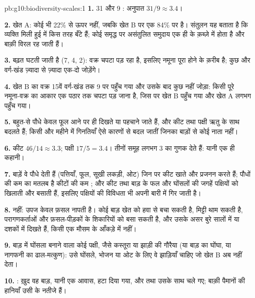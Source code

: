 \begin{solution}{pb:g10:biodiversity-scales:1}
\textbf{1.} 31 और 9 : अनुपात $31/9 \approx 3.4$।

\textbf{2.} खेत A: कोई भी  22\% से ऊपर नहीं, जबकि खेत B पर एक
84\% पर है। संतुलन यह बताता है कि व्यक्ति मिली हुई  में किस
तरह बँटे हैं; कोई समृद्ध पर असंतुलित समुदाय एक ही  के क़ब्ज़े में
होता है और बाक़ी विरल रह जाती हैं।

\textbf{3.} बढ़त घटती जाती है (7, 4, 2): वक्र चपटा पड़ रहा है, इसलिए
नमूना पूरा होने के क़रीब है; कुछ और वर्ग-खंड ज़्यादा से ज़्यादा एक-दो
 जोड़ेंगे।

\textbf{4.} खेत B का वक्र 15वें वर्ग-खंड तक 9 पर पहुँच गया और उसके बाद
कुछ नहीं जोड़ा: किसी पूरे नमूना-वक्र का आकार एक पठार तक चपटा पड़ जाना है,
जिस पर खेत B पहुँच गया और खेत A लगभग पहुँच गया।

\textbf{5.} बहुत-से पौधे केवल फूल आने पर ही दिखते या पहचाने जाते हैं, और
कीट तथा पक्षी ऋतु के साथ बदलते हैं; किसी और महीने में गिनतियाँ ऐसे
कारणों से बदल जातीं जिनका बाड़ों से कोई नाता नहीं।

\textbf{6.} कीट $46/14 \approx 3.3$; पक्षी $17/5 = 3.4$। तीनों समूह
लगभग 3 का गुणक देते हैं: यानी एक ही कहानी।

\textbf{7.} बाड़ें वे पौधे देती हैं (पत्तियाँ, फूल, सूखी लकड़ी, ओट)
जिन पर कीट खाते और प्रजनन करते हैं; पौधों की कम  का मतलब है
कीटों की कम ; और कीट तथा बाड़ के फल और घोंसलों की जगहें
पक्षियों को खिलाती और बसाती हैं, इसलिए पक्षियों की विविधता भी अपनी बारी
में गिर जाती है।

\textbf{8.} नहीं: उपज केवल फ़सल नापती है। कोई बाड़ खेत को हवा से बचा
सकती है, मिट्टी थाम सकती है, परागणकर्ताओं और फ़सल-पीड़कों के शिकारियों को
बसा सकती है, और उसके असर बुरे सालों में या दशकों में दिखते हैं, किसी एक
मौसम के आँकड़े में नहीं।

\textbf{9.} बाड़ में घोंसला बनाने वाला कोई पक्षी, जैसे कस्तूरा या
झाड़ी की गौरैया (या बाड़ का घोंघा, या नागफनी का ढाल-मत्कुण): उसे
घोंसले, भोजन या ओट के लिए वे झाड़ियाँ चाहिए जो खेत B अब नहीं देता।

\textbf{10.} : ख़ुद वह बाड़, यानी एक आवास, हटा दिया गया, और
 तथा  उसके साथ चले गए; बाक़ी पैमानों की हानियाँ उसी के
नतीजे हैं।


\end{solution}

